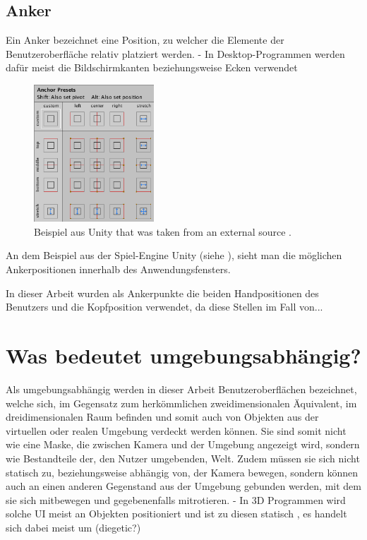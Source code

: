 		\subsection{Anker}
			Ein Anker bezeichnet eine Position, zu welcher die Elemente der Benutzeroberfläche relativ platziert werden.
			- In Desktop-Programmen werden dafür meist die Bildschirmkanten beziehungsweise Ecken verwendet
			\begin{figure}[htbp]
				\centering
				\includegraphics[width=0.4\textwidth]{figures/Ui_Anchor_Unity.png}
				\caption{Beispiel aus Unity that was taken from an external source .}
				\label{fig:unity}
			\end{figure}
			
			An dem Beispiel aus der Spiel-Engine Unity (siehe ), sieht man die möglichen Ankerpositionen innerhalb des Anwendungsfensters.  
			
			In dieser Arbeit wurden als Ankerpunkte die beiden Handpositionen des Benutzers und die Kopfposition verwendet, da diese Stellen im Fall von...
	
	\section{Was bedeutet umgebungsabhängig?}
		Als umgebungsabhängig werden in dieser Arbeit Benutzeroberflächen bezeichnet, welche sich, im Gegensatz zum herkömmlichen zweidimensionalen Äquivalent, im dreidimensionalen Raum befinden und somit auch von Objekten aus der virtuellen oder realen Umgebung verdeckt werden können. Sie sind somit nicht wie eine Maske, die zwischen Kamera und der Umgebung angezeigt wird, sondern wie Bestandteile der, den Nutzer umgebenden, Welt. Zudem müssen sie sich nicht statisch zu, beziehungsweise abhängig von, der Kamera bewegen, sondern können auch an einen anderen Gegenstand aus der Umgebung gebunden werden, mit dem sie sich mitbewegen und gegebenenfalls mitrotieren.
		- In 3D Programmen wird solche UI meist an Objekten positioniert und ist zu diesen statisch , es handelt sich dabei meist um (diegetic?)
	